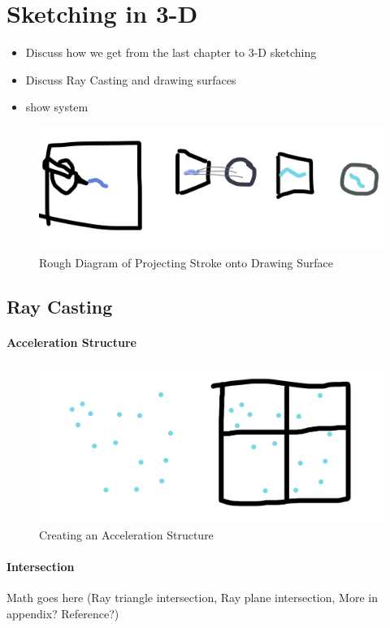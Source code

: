 \documentclass[12pt]{report}
\begin{document}
\pagebreak
\chapter{Sketching in 3-D}

\begin{itemize}
\item Discuss how we get from the last chapter to 3-D sketching
\item Discuss Ray Casting and drawing surfaces
\item show system
\end{itemize}

\begin{figure}
\includegraphics[width=0.9\linewidth]{StrokeProjection}
\caption{Rough Diagram of Projecting Stroke onto Drawing Surface}
\end{figure}

\section{Ray Casting}

\subsubsection{Acceleration Structure}
\begin{figure}[h]
\includegraphics[width=0.9\linewidth]{AccelerationStructureExample}
\caption{Creating an Acceleration Structure}
\end{figure}
\subsubsection{Intersection}
Math goes here (Ray triangle intersection, Ray plane intersection, More in appendix? Reference?)
\end{document}
